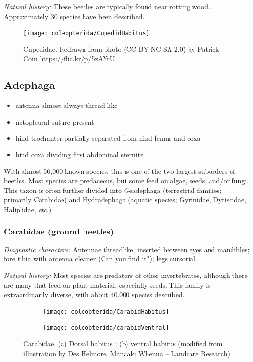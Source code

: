 \noindent{}\textit{Natural history:} These beetles are typically found near rotting wood. Approximately 30 species have been described.

\begin{figure}[ht!]
  \centering
    \texttt{[image: coleopterida/CupedidHabitus]}
  \caption{Cupedidae. Redrawn from photo (CC BY-NC-SA 2.0) by Patrick Coin \url{https://flic.kr/p/5zAYrU}}
  \label{fig:cupedid}%
\end{figure}

\subsection{Adephaga}
\begin{itemize}
\item antenna almost always thread-like
\item notopleural suture present 
\item hind trochanter partially separated from hind femur and coxa %
\item hind coxa dividing first abdominal sternite
\end{itemize}
With almost 50,000 known species, this is one of the two largest suborders of beetles. Most species are predaceous, but some feed on algae, seeds, and/or fungi. This taxon is often further divided into Geadephaga (terrestrial families; primarily Carabidae) and Hydradephaga (aquatic species; Gyrinidae, Dytiscidae, Haliplidae, \textit{etc}.) 

\subsubsection{Carabidae (ground beetles)} 
\noindent{}\textit{Diagnostic characters:} Antennae threadlike, inserted between eyes and mandibles; fore tibia with antenna cleaner (Can you find it?); legs cursorial.\vspace{3mm}

\noindent{}\textit{Natural history:} Most species are predators of other invertebrates, although there are many that feed on plant material, especially seeds. This family is extraordinarily diverse, with about 40,000 species described.

\begin{figure}[ht!]
  \centering
\begin{subfigure}[ht!]{0.44\textwidth}
   \texttt{[image: coleopterida/CarabidHabitus]}
   \caption{}
    \label{fig:carab2}
\end{subfigure}
    \qquad
\begin{subfigure}[ht!]{0.48\textwidth}
\texttt{[image: coleopterida/carabidVentral]}
   \caption{}
    \label{fig:carabVentral}
\end{subfigure}
    \caption{Carabidae. (a) Dorsal habitus \citep[Modified from][Plate 24, Fig. 1b]{reitter1908fauna}; (b) ventral habitus (modified from illustration by Des Helmore, Manaaki Whenua – Landcare Research)}
\end{figure}

